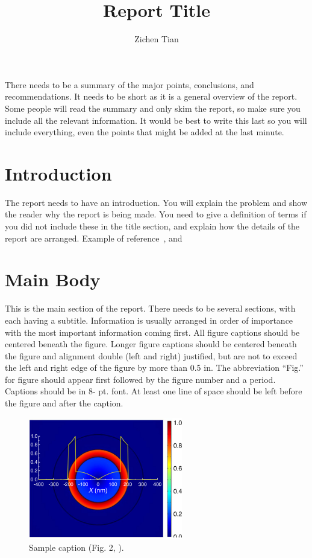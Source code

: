 \documentclass{osa-article}
\begin{document}
\title{Report Title}
\author{Zichen Tian\authormark{*}}
\address{School of Electrical and Electronic Engineering, Nanyang Technological University, 50 Nanyang Avenue, 639798, Singapore}

\begin{abstract*}
There needs to be a summary of the major points, conclusions, and recommendations. It needs to be short as it is a general overview of the report. Some people will read the summary and only skim the report, so make sure you include all the relevant information. It would be best to write this last so you will include everything, even the points that might be added at the last minute.
\end{abstract*}

\section{Introduction}
The report needs to have an introduction. You will explain the problem and show the reader why the report is being made. You need to give a definition of terms if you did not include these in the title section, and explain how the details of the report are arranged. Example of reference~\cite{gallo1999all, masters1998three}, and~\cite{Yelin:03}

\section{Main Body}

This is the main section of the report.  There needs to be several sections, with each having a subtitle.  Information is usually arranged in order of importance with the most important information coming first.
All figure captions should be centered beneath the figure. Longer figure captions should be centered beneath the figure and alignment double (left and right) justified, but are not to exceed the left and right edge of the figure by more than 0.5 in. The abbreviation “Fig.” for figure should appear first followed by the figure number and a period. Captions should be in 8- pt. font. At least one line of space should be left before the figure and after the caption.


\begin{figure}[h!]
\centering
\includegraphics[width=0.6\textwidth]{osafig1.pdf}
\caption{Sample caption (Fig. 2, \cite{Yelin:03}).}
\end{figure}
\end{document}
